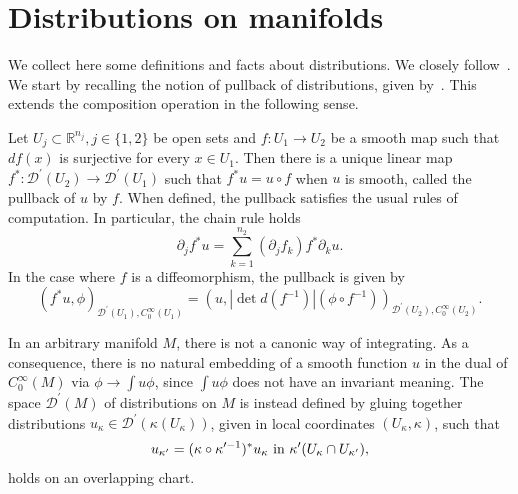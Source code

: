\documentclass[12pt,reqno]{amsart}
\numberwithin{equation}{section}
\theoremstyle{definition}
\theoremstyle{plain}
\theoremstyle{definition}
\theoremstyle{definition}
\newcommand{\R}{\mathbb{R}}
\def\R{\mathbb R}
\begin{document}
\section{Distributions on manifolds}
\label{ap_distrib_manifold}

We collect here some definitions and facts about distributions. We closely follow~\cite[Chapter 6]{hormander1990}. We start by recalling the notion of pullback of distributions, given by~\cite[Theorem 6.1.2]{hormander1990}. This extends the composition operation in the following sense.

Let $U_j \subset \R^{n_j}, j \in \{1,2\}$ be open sets and $f: U_1 \to U_2$ be a smooth map such that $df(x)$ is surjective for every $x \in U_1$. Then there is a unique linear map $f^*: \mathcal{D}^\prime(U_2) \to \mathcal{D}^\prime(U_1)$ such that $f^*u=u \circ f$ when $u$ is smooth, called the pullback of $u$ by $f$. When defined, the pullback satisfies the usual rules of computation. In particular, the chain rule holds
\begin{equation}
\label{eq_chain_rule}
    \partial_j f^*u=\sum_{k=1}^{n_2} (\partial_j f_k) f^* \partial_k u.
\end{equation}
In the case where $f$ is a diffeomorphism, the pullback is given by
\begin{equation}
\label{eq_pull_diffeo}
    (f^*u, \phi)_{\mathcal{D}^\prime(U_1), C^\infty_0(U_1)}=  (u, |\det d(f^{-1})|(\phi \circ f^{-1}))_{\mathcal{D}^\prime (U_2), C^\infty_0(U_2)}.
\end{equation}

\bigskip

In an arbitrary manifold $M$, there is not a canonic way of integrating. As a consequence, there is no natural embedding of a smooth function $u$ in the dual of $C^\infty_0(M)$ via $\phi \to \int u\phi$,  since $\int u \phi$ does not have an invariant meaning. The space $\mathcal{D}^\prime (M)$ of distributions on $M$ is instead defined by gluing together distributions $u_\kappa \in \mathcal{D}^\prime (\kappa(U_\kappa))$, given in local coordinates $(U_\kappa, \kappa )$, such that
\begin{equation}
\label{eq_trans_law_distrib}
    u_{\kappa^\prime}=(\kappa \circ \kappa^{\prime -1})^* u_\kappa \textnormal{ in } \kappa^\prime(U_\kappa \cap U_{\kappa^\prime}),
\end{equation}
holds on an overlapping chart.
\end{document}
